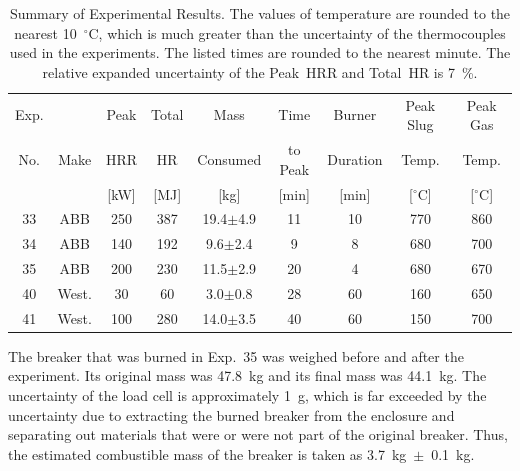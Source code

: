 \begin{table}[ht]
\begin{center}
\caption[Summary of Experimental Results]{Summary of Experimental Results. The values of temperature are rounded to the nearest 10~$^\circ$C, which is much greater than the uncertainty of the thermocouples used in the experiments. The listed times are rounded to the nearest minute. The relative expanded uncertainty of the Peak~HRR and Total~HR is 7~\%.}
\label{matrix}
\begin{tabular}{|c|c|c|c|c|c|c|c|c|}
\hline
Exp.   &                & Peak          & Total   & Mass            & Time            & Burner       & Peak Slug    & Peak Gas      \\
No.    & Make           & HRR           & HR      & Consumed        & to Peak         & Duration     & Temp.        & Temp.         \\
       &                & [kW]          & [MJ]    & [kg]            & [min]           & [min]        & [$^\circ$C]  & [$^\circ$C]   \\ \hline
33     & ABB            & 250           & 387     & 19.4$\pm$4.9    & 11              & 10           & 770          & 860           \\ \hline
34     & ABB            & 140           & 192     & 9.6$\pm$2.4     & 9               & 8            & 680          & 700           \\ \hline
35     & ABB            & 200           & 230     & 11.5$\pm$2.9    & 20              & 4            & 680          & 670           \\ \hline
40     & West.          & 30            & 60      & 3.0$\pm$0.8     & 28              & 60           & 160          & 650           \\ \hline
41     & West.          & 100           & 280     & 14.0$\pm$3.5    & 40              & 60           & 150          & 700           \\ \hline
\end{tabular}
\end{center}
\end{table}

The breaker that was burned in Exp.~35 was weighed before and after the experiment. Its original mass was 47.8~kg and its final mass was 44.1~kg. The uncertainty of the load cell is approximately 1~g, which is far exceeded by the uncertainty due to extracting the burned breaker from the enclosure and separating out materials that were or were not part of the original breaker. Thus, the estimated combustible mass of the breaker is taken as 3.7~kg~$\pm$~0.1~kg.

